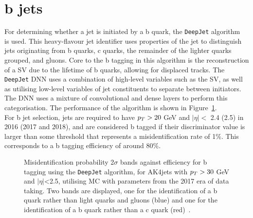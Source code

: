 \section{b jets}

For determining whether a jet is initiated by a b quark, the \texttt{DeepJet} algorithm~\cite{CMS:2017wtu,Bols:2020bkb} is used.  
This heavy-flavour jet identifier uses properties of the jet to distinguish jets originating from b quarks, c quarks, the remainder of the lighter quarks grouped, and gluons.
Core to the b tagging in this algorithm is the reconstruction of a \ac{SV} due to the lifetime of b quarks, allowing for displaced tracks.
The \texttt{DeepJet} \ac{DNN} uses a combination of high-level variables such as the \ac{SV}, as well as utilising low-level variables of jet constituents to separate between initiators.
The \ac{DNN} uses a mixture of convolutional and dense layers to perform this categorisation.
The performance of the algorithm is shown in Figure~\ref{fig:deepjet}. \\

For b jet selection, jets are required to have $p_{T} > 20$ GeV and $|\eta| <$ 2.4 (2.5) in 2016 (2017 and 2018), and are considered b tagged if their discriminator value is larger than some threshold that represents a misidentification rate of 1\%.
This corresponds to a b tagging efficiency of around 80\%.

\begin{figure}[!hbtp]
\centering
\caption{Misidentification probability 2$\sigma$ bands against efficiency for b tagging using the \texttt{DeepJet} algorithm, for AK4jets with $p_{T}>30$ GeV and $|\eta|$<2.5, utilising MC with parameters from the 2017 era of data taking. Two bands are displayed, one for the identification of a b quark rather than light quarks and gluons (blue) and one for the identification of a b quark rather than a c quark (red)~\cite{deepjet}.}
\label{fig:deepjet}
\end{figure}

